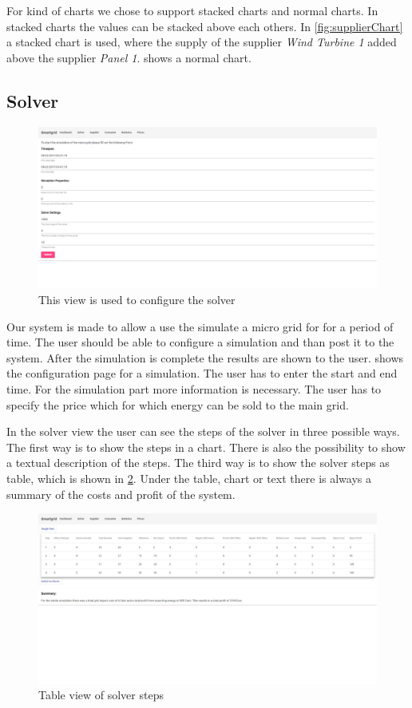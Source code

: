For kind of charts we chose to support stacked charts and normal charts.
In stacked charts the values can be stacked above each others.
In  \cref{fig:supplierChart} a stacked chart is used, where the supply of the supplier \textit{Wind Turbine 1} added above the supplier \textit{Panel 1}.
 shows a normal chart.

\subsection{Solver}\label{sec:solver}
\begin{figure}[!h]
    \centering
\includegraphics[width=1.00\textwidth]{../figures/SolverSettings.png}
    \caption{This view is used to configure the solver}
    \label{fig:solverSettings}
\end{figure}
Our system is made to allow a use the simulate a micro grid for for a period of time. 
The user should be able to configure a simulation and than post it to the system. 
After the simulation is complete the results are shown to the user. 
 shows the configuration page for a simulation. 
The user has to enter the start and end time. For the simulation part more information is necessary. The user has to specify the price which for which energy can be sold to the main grid.

In the solver view the user can see the steps of the solver in three possible ways.
The first way is to show the steps in a chart.
There is also the possibility to show a textual description of the steps.
The third way is to show the solver steps as table, which is shown in \cref{fig:solverTable}.
Under the table, chart or text there is always a summary of the costs and profit of the system.

\begin{figure}[!h]
    \centering
\includegraphics[width=1.00\textwidth]{../figures/SolverTable.png}
    \caption{Table view of solver steps}
    \label{fig:solverTable}
\end{figure}